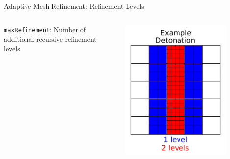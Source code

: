 \begin{frame}{Adaptive Mesh Refinement: Refinement Levels}
\begin{columns}
\texttt{maxRefinement}: Number of additional recursive refinement levels
\begin{center}
\includegraphics[width=0.8\textwidth]{../figs/amr_refine.png}
\end{center}
\end{columns}
\end{frame}


